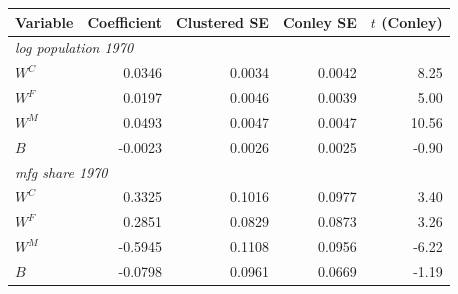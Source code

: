 \begin{tabular}{lrrrr}
\toprule
Variable & Coefficient & Clustered SE & Conley SE & $t$ (Conley) \\
\midrule
\multicolumn{5}{l}{\emph{log population 1970}} \\
\quad $W^C$ & 0.0346 & 0.0034 & 0.0042 & 8.25 \\
\quad $W^F$ & 0.0197 & 0.0046 & 0.0039 & 5.00 \\
\quad $W^M$ & 0.0493 & 0.0047 & 0.0047 & 10.56 \\
\quad $B$ & -0.0023 & 0.0026 & 0.0025 & -0.90 \\
\multicolumn{5}{l}{\emph{mfg share 1970}} \\
\quad $W^C$ & 0.3325 & 0.1016 & 0.0977 & 3.40 \\
\quad $W^F$ & 0.2851 & 0.0829 & 0.0873 & 3.26 \\
\quad $W^M$ & -0.5945 & 0.1108 & 0.0956 & -6.22 \\
\quad $B$ & -0.0798 & 0.0961 & 0.0669 & -1.19 \\
\bottomrule
\end{tabular}